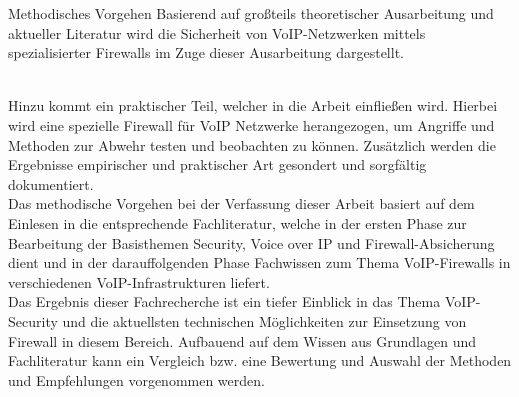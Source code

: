 \documentclass[a4paper,11pt,ngerman]{INSOexpose}
\begin{document}
\begin{section}{Methodisches Vorgehen}
Basierend auf großteils theoretischer Ausarbeitung und aktueller Literatur wird die Sicherheit von VoIP-Netzwerken mittels spezialisierter Firewalls im Zuge dieser Ausarbeitung dargestellt.

\\
Hinzu kommt ein praktischer Teil, welcher in die Arbeit einfließen wird. Hierbei wird eine spezielle Firewall für VoIP Netzwerke herangezogen, um Angriffe und Methoden zur Abwehr testen und beobachten zu können. Zusätzlich werden die Ergebnisse empirischer und praktischer Art gesondert und sorgfältig dokumentiert.
\\
Das methodische Vorgehen bei der Verfassung dieser Arbeit basiert auf dem Einlesen in die entsprechende Fachliteratur, welche in der ersten Phase zur Bearbeitung der Basisthemen Security, Voice over IP und Firewall-Absicherung dient und in der darauffolgenden Phase Fachwissen zum Thema VoIP-Firewalls in verschiedenen VoIP-Infrastrukturen liefert.
\\
Das Ergebnis dieser Fachrecherche ist ein tiefer Einblick in das Thema VoIP-Security und die aktuellsten technischen Möglichkeiten zur Einsetzung von Firewall in diesem Bereich. 
Aufbauend auf dem Wissen aus Grundlagen und Fachliteratur kann ein Vergleich bzw. eine Bewertung und Auswahl der Methoden und Empfehlungen vorgenommen werden. 
\end{section}
\pagebreak
\end{document}
